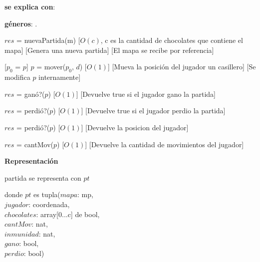 \documentclass{book}
\begin{document}
    \begin{Interfaz}

        \textbf{se explica con}: 

        \textbf{géneros}: .


            {$res$ = nuevaPartida(m)}%
            [$O(c)$, c es la cantidad de chocolates que contiene el mapa]
            [Genera una nueva partida]
            [El mapa se recibe por referencia]

            [$p_0$ = $p$]
            {$p$ = mover($p_0$, $d$)}%
            [$O(1)$]
            [Mueva la posición del jugador un casillero]
            [Se modifica $p$ internamente]

            {$res$ = ganó?($p$)}%
            [$O(1)$]
            [Devuelve true si el jugador gano la partida]

            {$res$ = perdió?($p$)}%
            [$O(1)$]
            [Devuelve true si el jugador perdio la partida]

            {$res$ = perdió?($p$)}%
            [$O(1)$]
            [Devuelve la posicion del jugador]

            {$res$ = cantMov($p$)}%
            [$O(1)$]
            [Devuelve la cantidad de movimientos del jugador]

    \end{Interfaz}

    \newpage

    \textbf{Representación}

    partida se representa con $pt$

    donde $pt$ es tupla($mapa$: mp, \\
        \text{}\qquad\quad$jugador$: coordenada, \\
        \text{}\qquad\quad$chocolates$: array[0...c] de bool, \\
        \text{}\qquad\quad$cantMov$: nat, \\
        \text{}\qquad\quad$inmunidad$: nat, \\
        \text{}\qquad\quad$gano$: bool, \\
        \text{}\qquad\quad$perdio$: bool)
\end{document}
